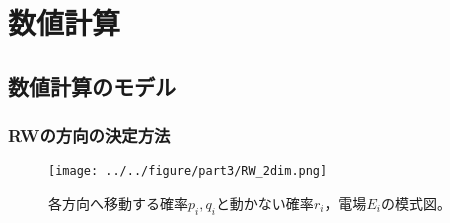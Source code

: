 \documentclass[autodetect-engine,dvi=dvipdfmx,a4paper,ja=standard,oneside,openany,11pt]{bxjsbook}
\begin{document}
\chapter{数値計算}
\section{数値計算のモデル}
\subsection{RWの方向の決定方法}
\begin{figure}[htbp]
  \centering
  \texttt{[image: ../../figure/part3/RW\_2dim.png]}
  \caption{各方向へ移動する確率$p_i,q_i$と動かない確率$r_i$，電場$E_i$の模式図。}
  \label{fig:RW_2dim}
\end{figure}
\end{document}
